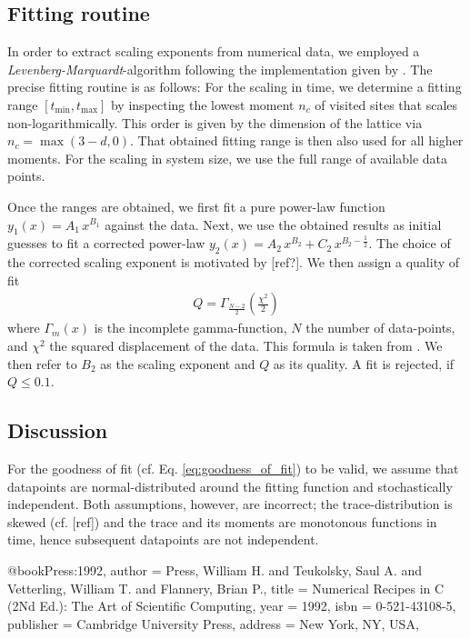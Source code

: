\subsection{Fitting routine}
In order to extract scaling exponents from numerical data, we employed a \textit{Levenberg-Marquardt}-algorithm following the implementation given by \cite{Press92}. The precise fitting routine is as follows: For the scaling in time, we determine a fitting range $[t_{\text{min}},t_{\text{max}}]$ by inspecting the lowest moment $n_c$ of visited sites that scales non-logarithmically. This order is given by the dimension of the lattice via $n_c = \max(3-d,0)$. That obtained fitting range is then also used for all higher moments. For the scaling in system size, we use the full range of available data points.

Once the ranges are obtained, we first fit a pure power-law function $y_1(x) = A_1\,x^{B_1}$ against the data. Next, we use the obtained results as initial guesses to fit a corrected power-law $y_2(x) = A_2 \, x^{B_2} + C_2 \, x^{B_2 - \frac{1}{2}}$. The choice of the corrected scaling exponent is motivated by [ref?]. We then assign a quality of fit 
\begin{align}Q = \Gamma_{\frac{N-2}{2}}\left(\frac{\chi^2}{2}\right)
	\label{eq:goodness_of_fit}
\end{align}
where $\Gamma_m(x)$ is the incomplete gamma-function, $N$ the number of data-points, and $\chi^2$ the squared displacement of the data. This formula is taken from \cite{Press92}. We then refer to $B_2$ as the scaling exponent and $Q$ as its quality. A fit is rejected, if $Q\leq 0.1$. %

\subsection{Discussion}
For the goodness of fit (cf. Eq. \eqref{eq:goodness_of_fit}) to be valid, we assume that datapoints are normal-distributed around the fitting function and stochastically independent. Both assumptions, however, are incorrect; the trace-distribution is skewed (cf. [ref])
and the trace and its moments are monotonous functions in time, hence subsequent datapoints are not independent.

@book{Press:1992,
	author = {Press, William H. and Teukolsky, Saul A. and Vetterling, William T. and Flannery, Brian P.},
	title = {Numerical Recipes in C (2Nd Ed.): The Art of Scientific Computing},
	year = {1992},
	isbn = {0-521-43108-5},
	publisher = {Cambridge University Press},
	address = {New York, NY, USA},
      } 
